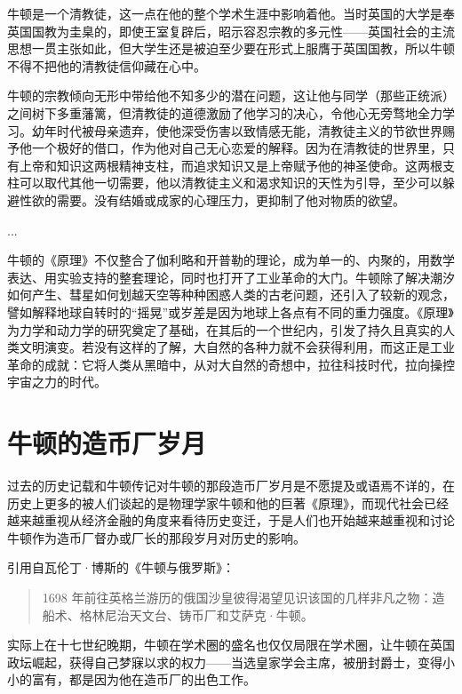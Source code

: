\documentclass[12pt,oneside]{book}
\begin{document}
\begin{bookref}[frametitle={\cite{牛顿传}}]
牛顿是一个清教徒，这一点在他的整个学术生涯中影响着他。当时英国的大学是奉英国国教为圭臬的，即使王室复辟后，昭示容忍宗教的多元性——英国社会的主流思想一贯主张如此，但大学生还是被迫至少要在形式上服膺于英国国教，所以牛顿不得不把他的清教徒信仰藏在心中。

牛顿的宗教倾向无形中带给他不知多少的潜在问题，这让他与同学（那些正统派）之间树下多重藩篱，但清教徒的道德激励了他学习的决心，令他心无旁骛地全力学习。幼年时代被母亲遗弃，使他深受伤害以致情感无能，清教徒主义的节欲世界赐予他一个极好的借口，作为他对自己无心恋爱的解释。因为在清教徒的世界里，只有上帝和知识这两根精神支柱，而追求知识又是上帝赋予他的神圣使命。这两根支柱可以取代其他一切需要，他以清教徒主义和渴求知识的天性为引导，至少可以躲避性欲的需要。没有结婚或成家的心理压力，更抑制了他对物质的欲望。

...


牛顿的《原理》不仅整合了伽利略和开普勒的理论，成为单一的、内聚的，用数学表达、用实验支持的整套理论，同时也打开了工业革命的大门。牛顿除了解决潮汐如何产生、彗星如何划越天空等种种困惑人类的古老问题，还引入了较新的观念，譬如解释地球自转时的“摇晃”或岁差是因为地球上各点有不同的重力强度。《原理》为力学和动力学的研究奠定了基础，在其后的一个世纪内，引发了持久且真实的人类文明演变。若没有这样的了解，大自然的各种力就不会获得利用，而这正是工业革命的成就：它将人类从黑暗中，从对大自然的奇想中，拉往科技时代，拉向操控宇宙之力的时代。

\end{bookref}





\chapter{牛顿的造币厂岁月}
过去的历史记载和牛顿传记对牛顿的那段造币厂岁月是不愿提及或语焉不详的，在历史上更多的被人们谈起的是物理学家牛顿和他的巨著《原理》，而现代社会已经越来越重视从经济金融的角度来看待历史变迁，于是人们也开始越来越重视和讨论牛顿作为造币厂督办或厂长的那段岁月对历史的影响。

引用自瓦伦丁·博斯的《牛顿与俄罗斯》：
\begin{quotation}
1698 年前往英格兰游历的俄国沙皇彼得渴望见识该国的几样非凡之物：造船术、格林尼治天文台、铸币厂和艾萨克·牛顿。
\end{quotation}

实际上在十七世纪晚期，牛顿在学术圈的盛名也仅仅局限在学术圈，让牛顿在英国政坛崛起，获得自己梦寐以求的权力——当选皇家学会主席，被册封爵士，变得小小的富有，都是因为他在造币厂的出色工作。
\end{document}
